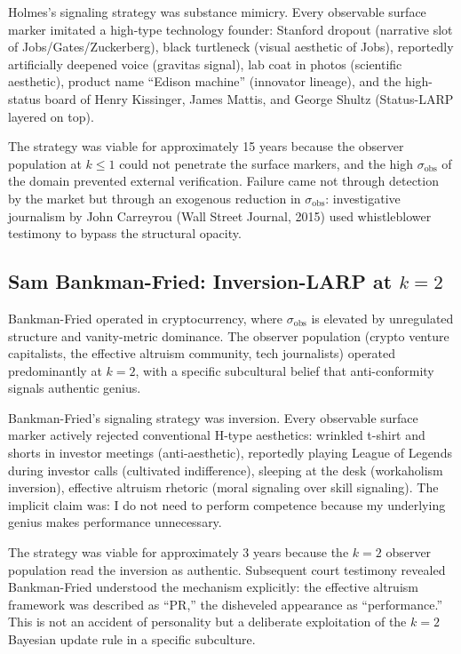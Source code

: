 \documentclass[11pt]{article}
\begin{document}
Holmes's signaling strategy was substance mimicry. Every observable surface marker imitated a high-type technology founder: Stanford dropout (narrative slot of Jobs/Gates/Zuckerberg), black turtleneck (visual aesthetic of Jobs), reportedly artificially deepened voice (gravitas signal), lab coat in photos (scientific aesthetic), product name ``Edison machine'' (innovator lineage), and the high-status board of Henry Kissinger, James Mattis, and George Shultz (Status-LARP layered on top).

The strategy was viable for approximately 15 years because the observer population at $k \leq 1$ could not penetrate the surface markers, and the high $\sigma_{\mathrm{obs}}$ of the domain prevented external verification. Failure came not through detection by the market but through an exogenous reduction in $\sigma_{\mathrm{obs}}$: investigative journalism by John Carreyrou (Wall Street Journal, 2015) used whistleblower testimony to bypass the structural opacity.

\subsection{Sam Bankman-Fried: Inversion-LARP at $k = 2$}

Bankman-Fried operated in cryptocurrency, where $\sigma_{\mathrm{obs}}$ is elevated by unregulated structure and vanity-metric dominance. The observer population (crypto venture capitalists, the effective altruism community, tech journalists) operated predominantly at $k = 2$, with a specific subcultural belief that anti-conformity signals authentic genius.

Bankman-Fried's signaling strategy was inversion. Every observable surface marker actively rejected conventional H-type aesthetics: wrinkled t-shirt and shorts in investor meetings (anti-aesthetic), reportedly playing League of Legends during investor calls (cultivated indifference), sleeping at the desk (workaholism inversion), effective altruism rhetoric (moral signaling over skill signaling). The implicit claim was: I do not need to perform competence because my underlying genius makes performance unnecessary.

The strategy was viable for approximately 3 years because the $k = 2$ observer population read the inversion as authentic. Subsequent court testimony revealed Bankman-Fried understood the mechanism explicitly: the effective altruism framework was described as ``PR,'' the disheveled appearance as ``performance.'' This is not an accident of personality but a deliberate exploitation of the $k = 2$ Bayesian update rule in a specific subculture.
\end{document}
